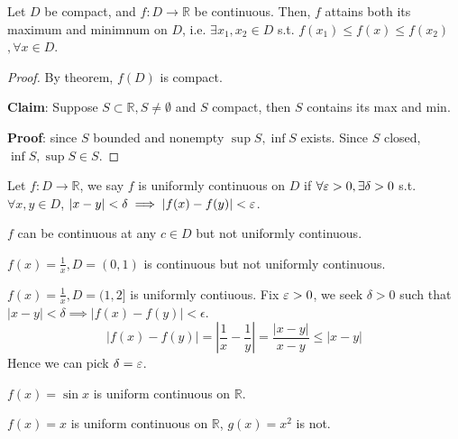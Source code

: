 \begin{corollary}
    Let $D$ be compact, and $f: D \to \mathbb{R}$ be continuous. 
    Then, $f$ attains both its maximum and minimnum on $D$, i.e.
    $\exists x_1, x_2 \in D$ s.t. $f(x_1) \leq f(x) \leq f(x_2)$ 
    $, \forall x \in D$.
\end{corollary}

\begin{proof}
    By theorem, $f(D)$ is compact.
    \medskip

    \textbf{Claim}: Suppose $S \subset \mathbb{R}, S \neq \emptyset$
    and $S$ compact, then $S$ contains its max and min. 

    \textbf{Proof}: since $S$ bounded and nonempty $\sup S, \inf S$ exists.
    Since $S$ closed, $\inf S, \sup S \in S$. 
\end{proof}

\begin{definition}
    Let $f: D \to \mathbb{R}$, we say $f$ is uniformly continuous on $D$ if 
    $\forall \varepsilon > 0, \exists \delta > 0$ s.t. $\forall x, y \in D$, 
    $|x - y| < \delta \implies |f(x)- f(y) | < \varepsilon$.
\end{definition}

\begin{remark}
    $f$ can be continuous at any $c \in D$ but not uniformly continuous.
\end{remark}

\begin{example}
    $f(x) = \frac{1}{x}, D = \left( 0, 1 \right) $ is continuous but 
    not uniformly continuous.
\end{example}

\begin{example}
    $f(x) = \frac{1}{x}, D = (1, 2]$ is uniformly contiuous. 
    Fix $\varepsilon > 0$, we seek $\delta > 0$ such that $|x-y| < \delta \implies |f(x) - f(y) | < \epsilon$. 
    \[
        |f(x) - f(y)|= \left| \frac{1}{x} - \frac{1}{y} \right|  = 
        \frac{ \left| x- y \right| }{x-y} \leq |x-y|
    \]
    Hence we can pick $\delta = \varepsilon$.
\end{example}

\begin{example}
    $f(x) = \sin x$ is uniform continuous on $\mathbb{R}$.
\end{example}

\begin{example}
    $f(x) = x$ is uniform continuous on $\mathbb{R}$,
    $g(x) = x^{2}$ is not.
\end{example}


